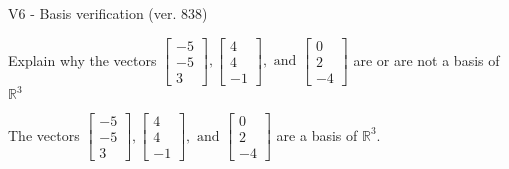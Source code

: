 \begin{exercise}
  \begin{exerciseTitle}V6 - Basis verification (ver. 838)\end{exerciseTitle}
  \begin{exerciseStatement}
    Explain why the vectors \(\left[\begin{array}{r}
-5 \\
-5 \\
3
\end{array}\right] , \left[\begin{array}{r}
4 \\
4 \\
-1
\end{array}\right] , \text{ and } \left[\begin{array}{r}
0 \\
2 \\
-4
\end{array}\right]\) are or are not a basis of \(\mathbb{R}^3\)	


  \end{exerciseStatement}
  \begin{exerciseAnswer}
   The vectors \(\left[\begin{array}{r}
-5 \\
-5 \\
3
\end{array}\right] , \left[\begin{array}{r}
4 \\
4 \\
-1
\end{array}\right] , \text{ and } \left[\begin{array}{r}
0 \\
2 \\
-4
\end{array}\right]\) 
  	 are  a basis of \(\mathbb{R}^3\).
  


  \end{exerciseAnswer}
\end{exercise}